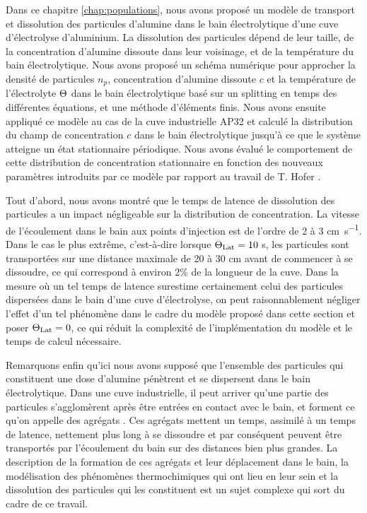 Dans ce chapitre \ref{chap:populations}, nous avons proposé un modèle
de transport et dissolution des particules d'alumine dans le bain
électrolytique d'une cuve d'électrolyse d'aluminium. La dissolution
des particules dépend de leur taille, de la concentration d'alumine
dissoute dans leur voisinage, et de la température du bain
électrolytique. Nous avons proposé un schéma numérique pour approcher
la densité de particules $n_p$, concentration d'alumine dissoute $c$
et la température de l'électrolyte $\Theta$ dans le bain
électrolytique basé sur un splitting en temps des différentes
équations, et une méthode d'éléments finis. Nous avons ensuite
appliqué ce modèle au cas de la cuve industrielle AP32 et calculé la
distribution du champ de concentration $c$ dans le bain électrolytique
jusqu'à ce que le système atteigne un état stationnaire
périodique. Nous avons évalué le comportement de cette distribution de
concentration stationnaire en fonction des nouveaux paramètres
introduits par ce modèle par rapport au travail de T. Hofer
\cite{Hofer2011}.

Tout d'abord, nous avons montré que le temps de latence de dissolution
des particules a un impact négligeable sur la distribution de
concentration. La vitesse de l'écoulement dans le bain aux points
d'injection est de l'ordre de 2 à 3 \si{\centi\meter\per\second}. Dans
le cas le plus extrême, c'est-à-dire lorsque $\Theta_\text{Lat} = 10$
\si{\second}, les particules sont transportées sur une distance
maximale de 20 à 30 \si{\centi\meter} avant de commencer à se
dissoudre, ce qui correspond à environ 2\% de la longueur de la
cuve. Dans la mesure où un tel temps de latence surestime certainement
celui des particules dispersées dans le bain d'une cuve d'électrolyse,
on peut raisonnablement négliger l'effet d'un tel phénomène dans le
cadre du modèle proposé dans cette section et poser $\Theta_\text{Lat} = 0$, ce
qui réduit la complexité de l'implémentation du modèle et le temps de
calcul nécessaire.

Remarquons enfin qu'ici nous avons supposé que l'ensemble des
particules qui constituent une dose d'alumine pénètrent et se
dispersent dans le bain électrolytique. Dans une cuve industrielle, il
peut arriver qu'une partie des particules s'agglomèrent après être
entrées en contact avec le bain, et forment ce qu'on appelle des agrégats
\cite{Dassylva2015}. Ces agrégats mettent un temps, assimilé à un
temps de latence, nettement plus long à se dissoudre et par conséquent
peuvent être transportés par l'écoulement du bain sur des distances bien
plus grandes. La description de la formation de ces agrégats et leur
déplacement dans le bain, la modélisation des phénomènes
thermochimiques qui ont lieu en leur sein et la dissolution des
particules qui les constituent est un sujet complexe qui sort du cadre
de ce travail.

